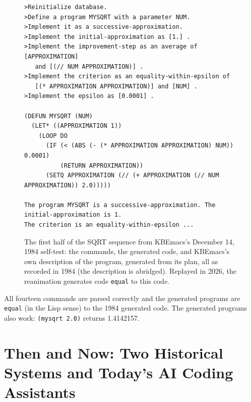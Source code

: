 \documentclass[11pt]{article}
\begin{document}
\begin{figure}[H]
\begin{lstlisting}
>Reinitialize database.
>Define a program MYSQRT with a parameter NUM.
>Implement it as a successive-approximation.
>Implement the initial-approximation as [1.] .
>Implement the improvement-step as an average of [APPROXIMATION]
   and [(// NUM APPROXIMATION)] .
>Implement the criterion as an equality-within-epsilon of
   [(* APPROXIMATION APPROXIMATION)] and [NUM] .
>Implement the epsilon as [0.0001] .

(DEFUN MYSQRT (NUM)
  (LET* ((APPROXIMATION 1))
    (LOOP DO
      (IF (< (ABS (- (* APPROXIMATION APPROXIMATION) NUM)) 0.0001)
          (RETURN APPROXIMATION))
      (SETQ APPROXIMATION (// (+ APPROXIMATION (// NUM APPROXIMATION)) 2.0)))))

The program MYSQRT is a successive-approximation. The initial-approximation is 1.
The criterion is an equality-within-epsilon ...
\end{lstlisting}
\caption{The first half of the SQRT sequence from KBEmacs's December
  14, 1984 self-test: the commands, the generated code, and KBEmacs's
  own description of the program, generated from its plan, all as
  recorded in 1984 (the description is abridged). Replayed in 2026,
  the reanimation generates code \texttt{equal} to this code.}
\label{fig:sqrt}
\end{figure}

All fourteen commands are parsed correctly and the generated programs
are \texttt{equal} (in the Lisp sense) to the 1984 generated
code. The generated programs also work: \texttt{(mysqrt 2.0)} returns
1.4142157.

\section{Then and Now: Two Historical Systems and Today's AI Coding Assistants}
\label{sec:thenandnow}
\end{document}
